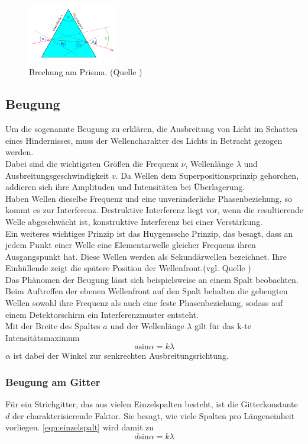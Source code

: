 \begin{figure}
    \centering
    \includegraphics[width=0.35\textwidth]{prisma.png}
    \caption{Brechung am Prisma. (Quelle \cite{versuch})}
    \label{fig:prisma}
\end{figure}

\subsection{Beugung}
Um die sogenannte Beugung zu erklären, die Ausbreitung von Licht im 
Schatten eines Hindernisses, muss der Wellencharakter des Lichts in 
Betracht gezogen werden.\\
Dabei sind die wichtigsten Größen die Frequenz $\nu$, Wellenlänge $\lambda$
und Ausbreitungsgeschwindigkeit $v$. Da Wellen dem Superpositionsprinzip
gehorchen, addieren sich ihre Amplituden und Intensitäten bei Überlagerung.
\\
Haben Wellen dieselbe Frequenz und eine unveränderliche Phasenbeziehung,
so kommt es zur Interferenz. Destruktive Interferenz liegt vor, wenn die 
resultierende Welle abgeschwächt ist, konstruktive Interferenz bei einer
Verstärkung. \\
Ein weiteres wichtiges Prinzip ist das Huygenssche Prinzip, das besagt, dass
an jedem Punkt einer Welle eine Elementarwelle gleicher Frequenz ihren Ausgangspunkt
hat. Diese Wellen werden als Sekundärwellen bezeichnet. Ihre Einhüllende
zeigt die spätere Position der Wellenfront.(vgl. Quelle \cite{versuch})
\\
Das Phänomen der Beugung lässt sich beispielsweise an einem Spalt beobachten.
Beim Auftreffen der ebenen Wellenfront auf den Spalt behalten die gebeugten
Wellen sowohl ihre Frequenz als auch eine feste Phasenbeziehung, sodass auf einem
Detektorschirm ein Interferenzmuster entsteht.\\
Mit der Breite des Spaltes $a$ und der Wellenlänge $\lambda$ gilt für das 
k-te Intensitätsmaximum 
\begin{equation}
    a \text{sin} \alpha = k \lambda
    \label{eqn:einzelspalt}
\end{equation}
$\alpha$ ist dabei der Winkel zur senkrechten Ausbreitungsrichtung.

\subsubsection{Beugung am Gitter}
Für ein Strichgitter, das aus vielen Einzelspalten besteht, ist die Gitterkonstante $d$
der charakterisierende Faktor. Sie besagt, wie viele Spalten pro Längeneinheit 
vorliegen. \eqref{eqn:einzelspalt} wird damit zu
\begin{equation}
    d \text{sin} \alpha = k \lambda
    \label{eqn:strichgitter}
\end{equation}
